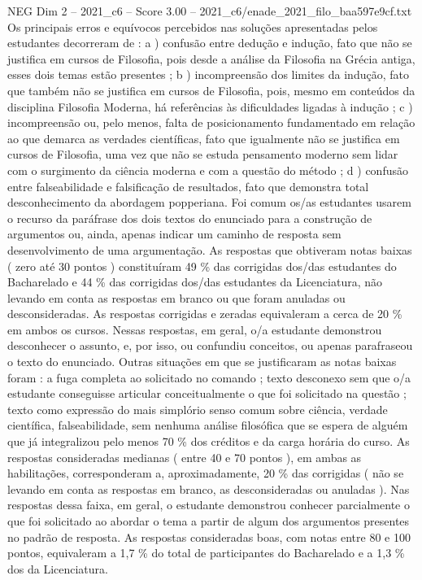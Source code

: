 \begin{textsample}{NEG Dim 2 – 2021\_c6 – Score 3.00 – 2021\_c6/enade\_2021\_filo\_baa597e9cf.txt}
Os principais erros e equívocos percebidos nas soluções apresentadas pelos estudantes decorreram de : a ) confusão entre dedução e indução, fato que não se justifica em cursos de Filosofia, pois desde a análise da Filosofia na Grécia antiga, esses dois temas estão presentes ; b ) incompreensão dos limites da indução, fato que também não se justifica em cursos de Filosofia, pois, mesmo em conteúdos da disciplina Filosofia Moderna, há referências às dificuldades ligadas à indução ; c ) incompreensão ou, pelo menos, falta de posicionamento fundamentado em relação ao que demarca as verdades científicas, fato que igualmente não se justifica em cursos de Filosofia, uma vez que não se estuda pensamento moderno sem lidar com o surgimento da ciência moderna e com a questão do método ; d ) confusão entre falseabilidade e falsificação de resultados, fato que demonstra total desconhecimento da abordagem popperiana.
Foi comum os/as estudantes usarem o recurso da paráfrase dos dois textos do enunciado para a construção de argumentos ou, ainda, apenas indicar um caminho de resposta sem desenvolvimento de uma argumentação.
As respostas que obtiveram notas baixas ( zero até 30 pontos ) constituíram 49 \% das corrigidas dos/das estudantes do Bacharelado e 44 \% das corrigidas dos/das estudantes da Licenciatura, não levando em conta as respostas em branco ou que foram anuladas ou desconsideradas.
As respostas corrigidas e zeradas equivaleram a cerca de 20 \% em ambos os cursos.
Nessas respostas, em geral, o/a estudante demonstrou desconhecer o assunto, e, por isso, ou confundiu conceitos, ou apenas parafraseou o texto do enunciado.
Outras situações em que se justificaram as notas baixas foram : a fuga completa ao solicitado no comando ; texto desconexo sem que o/a estudante conseguisse articular conceitualmente o que foi solicitado na questão ; texto como expressão do mais simplório senso comum sobre ciência, verdade científica, falseabilidade, sem nenhuma análise filosófica que se espera de alguém que já integralizou pelo menos 70 \% dos créditos e da carga horária do curso.
As respostas consideradas medianas ( entre 40 e 70 pontos ), em ambas as habilitações, corresponderam a, aproximadamente, 20 \% das corrigidas ( não se levando em conta as respostas em branco, as desconsideradas ou anuladas ).
Nas respostas dessa faixa, em geral, o estudante demonstrou conhecer parcialmente o que foi solicitado ao abordar o tema a partir de algum dos argumentos presentes no padrão de resposta.
As respostas consideradas boas, com notas entre 80 e 100 pontos, equivaleram a 1,7 \% do total de participantes do Bacharelado e a 1,3 \% dos da Licenciatura.

\end{textsample}
